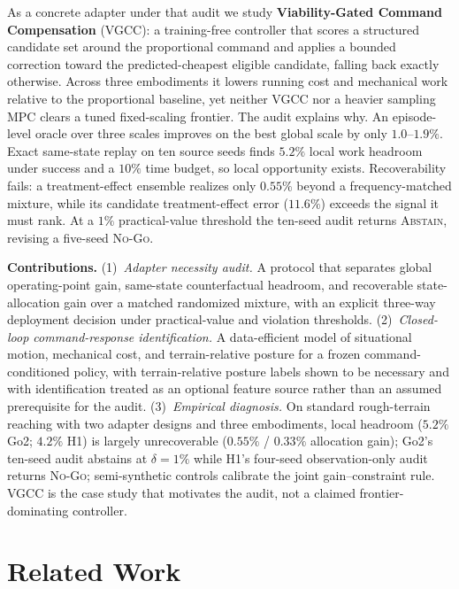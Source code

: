\documentclass{article}
\begin{document}
As a concrete adapter under that audit we study
\textbf{Viability-Gated Command Compensation} (VGCC): a training-free controller
that scores a structured candidate set around the proportional command and
applies a bounded correction toward the predicted-cheapest eligible candidate,
falling back exactly otherwise. Across three embodiments it lowers running cost
and mechanical work relative to the proportional baseline, yet neither VGCC nor a
heavier sampling MPC clears a tuned fixed-scaling frontier. The audit explains
why. An episode-level oracle over three scales improves on the best global scale
by only $1.0$--$1.9\%$. Exact same-state replay on ten source seeds finds
$5.2\%$ local work headroom under success and a $10\%$ time budget, so local
opportunity exists. Recoverability fails: a treatment-effect ensemble realizes
only $0.55\%$ beyond a frequency-matched mixture, while its candidate
treatment-effect error ($11.6\%$) exceeds the signal it must rank. At a $1\%$
practical-value threshold the ten-seed audit returns \textsc{Abstain}, revising a
five-seed \textsc{No-Go}.

\textbf{Contributions.}
(1)~\emph{Adapter necessity audit.} A protocol that separates global
operating-point gain, same-state counterfactual headroom, and recoverable
state-allocation gain over a matched randomized mixture, with an explicit
three-way deployment decision under practical-value and violation thresholds.
(2)~\emph{Closed-loop command-response identification.} A data-efficient model
of situational motion, mechanical cost, and terrain-relative posture for a
frozen command-conditioned policy, with terrain-relative posture labels shown
to be necessary and with identification treated as an optional feature source
rather than an assumed prerequisite for the audit.
(3)~\emph{Empirical diagnosis.} On standard rough-terrain reaching with two
adapter designs and three embodiments, local headroom ($5.2\%$ Go2; $4.2\%$ H1)
is largely unrecoverable ($0.55\%$ / $0.33\%$ allocation gain); Go2's ten-seed
audit abstains at $\delta=1\%$ while H1's four-seed observation-only audit
returns \textsc{No-Go}; semi-synthetic controls calibrate the joint
gain--constraint rule. VGCC is the case study that motivates the audit, not a
claimed frontier-dominating controller.

\section{Related Work}
\label{sec:related}
\end{document}
